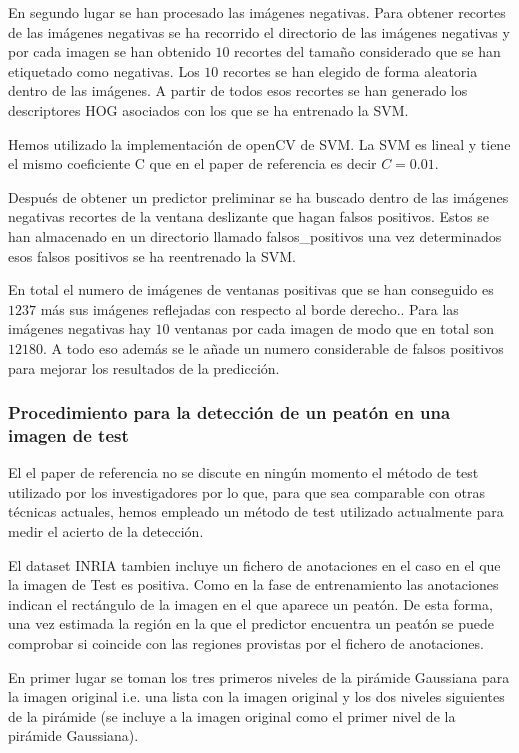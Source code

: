 \documentclass[a4paper,12pt]{article}
\begin{document}
En segundo lugar se han procesado las imágenes negativas. Para
obtener recortes de las imágenes negativas se ha recorrido el
directorio de las imágenes negativas y por cada imagen se han
obtenido $10$ recortes del tamaño considerado que se han etiquetado
como negativas. Los $10$ recortes se han elegido de forma aleatoria
dentro de las imágenes. A partir de todos esos recortes se han generado
los descriptores HOG asociados con los que se ha entrenado la SVM.

Hemos utilizado la implementación de openCV de SVM. La SVM es
lineal y tiene el mismo coeficiente C que en el paper de referencia
es decir $C = 0.01$.

Después de obtener un predictor preliminar se ha buscado dentro de las
imágenes negativas recortes de la ventana deslizante que hagan falsos
positivos. Estos se han almacenado en un directorio llamado falsos\_positivos
una vez determinados esos falsos positivos se ha reentrenado la SVM.

En total el numero de imágenes de ventanas positivas que se han
conseguido es $1237$ más sus imágenes reflejadas con respecto al borde derecho.. Para las imágenes negativas hay $10$ ventanas por
cada imagen de modo que en total son $12180$. A todo eso además se le añade
un numero considerable de falsos positivos para mejorar los resultados
de la predicción.

\subsubsection{Procedimiento para la detección de un peatón en una imagen de test}

El el paper de referencia no se discute en ningún momento el método de test utilizado por los investigadores por lo que, para que sea comparable con otras técnicas actuales, hemos empleado un método de test utilizado actualmente para medir el acierto de la detección.


El dataset INRIA tambien incluye un fichero de anotaciones en el caso en el que la imagen de Test es positiva. Como en la fase de entrenamiento las anotaciones indican el rectángulo de la imagen en el que aparece un peatón. De esta forma, una vez estimada la región en la que el predictor encuentra un peatón se puede comprobar si coincide con las regiones provistas por el fichero de anotaciones. 

En primer lugar se toman los tres primeros niveles de la pirámide Gaussiana para la imagen original i.e. una lista con la imagen original y los dos niveles siguientes de la pirámide (se incluye a la imagen original como el primer nivel de la pirámide Gaussiana).
\end{document}
